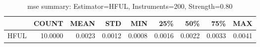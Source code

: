 \begin{table}[ht]
\centering
\caption{mse summary: Estimator=HFUL, Instruments=200, Strength=0.80}
\begin{tabular}{lrrrrrrrr}
\toprule
 & COUNT & MEAN & STD & MIN & 25\% & 50\% & 75\% & MAX \\
\midrule
HFUL & 10.0000 & 0.0023 & 0.0012 & 0.0008 & 0.0016 & 0.0022 & 0.0033 & 0.0041 \\
\bottomrule
\end{tabular}
\end{table}
